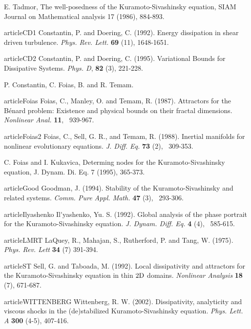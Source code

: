 E. Tadmor, The well-posedness of the {Kuramoto-Sivashinsky} equation,
SIAM Journal on Mathematical analysis 17 (1986), 884-893.


article{CD1} Constantin, P. and Doering, C. (1992).
Energy dissipation in shear driven turbulence.
{\it Phys. Rev. Lett.} {\bf 69} (11), 1648-1651.

article{CD2} Constantin, P. and Doering, C. (1995).
Variational Bounds for Dissipative Systems.
{\it Phys. D}, {\bf 82} (3), 221-228.

P. Constantin, C. Foias, B.  and R. Temam.

article{Foias}
Foias, C., Manley, O. and Temam, R. (1987).
Attractors for the {B\'{e}nard} problem:
{Existence} and physical bounds on their fractal dimensions.
{\it Nonlinear Anal.}
{\bf 11}, ~939-967.

article{Foias2}
Foias, C., Sell, G. R., and  Temam, R. (1988).
Inertial manifolds for nonlinear evolutionary equations.
{\it J. Diff. Eq.}
{\bf 73} (2), ~309-353.

C. Foias and I. Kukavica, Determing nodes for the {Kuramoto-Sivashinsky} equation,
J. Dynam. Di. Eq. 7 (1995), 365-373.

article{Good}
Goodman, J. (1994).
Stability of the {Kuramoto-Sivashinsky} and related systems.
{\it Comm. Pure Appl. Math.}
{\bf 47} (3), ~293-306.

article{Ilyashenko}
Il\'{}yashenko, Yu. S. (1992).
Global analysis of the phase portrait for the {Kuramoto-Sivashinsky} equation.
{\it J. Dynam. Diff. Eq.}
{\bf 4}  (4), ~585-615.

article{LMRT} LaQuey, R., Mahajan, S., Rutherford, P. and Tang, W. (1975).
{\it Phys. Rev. Lett} {\bf 34} (7) 391-394.

article{ST} Sell, G. and Taboada, M. (1992).
 Local dissipativity and attractors for the {Kuramoto-Sivashinsky}
equation in thin $2{\rm D}$ domains.
{\it Nonlinear Analysis} {\bf 18} (7), 671-687.

article{WITTENBERG}
Wittenberg, R. W. (2002).
Dissipativity, analyticity and viscous shocks in the (de)stabilized
{Kuramoto-Sivashinsky} equation.
{\it Phys. Lett. A}
{\bf 300} (4-5), 407-416.
